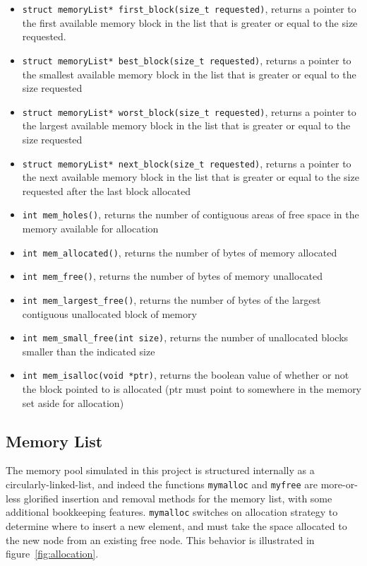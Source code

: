 \documentclass[paper=a4, fontsize=11pt]{scrartcl}
\begin{document}
\begin{itemize}
  \item \texttt{struct memoryList* first\_block(size\_t requested)}, returns a pointer to the first available memory block in the list that is greater or equal to the size requested.
  \item \texttt{struct memoryList* best\_block(size\_t requested)}, returns a pointer to the smallest available memory block in the list that is greater or equal to the size requested
  \item \texttt{struct memoryList* worst\_block(size\_t requested)}, returns a pointer to the largest available memory block in the list that is greater or equal to the size requested
  \item \texttt{struct memoryList* next\_block(size\_t requested)}, returns a pointer to the next available memory block in the list that is greater or equal to the size requested after the last block allocated
  \item \texttt{int mem\_holes()}, returns the number of contiguous areas of free space in the memory available for allocation
  \item \texttt{int mem\_allocated()}, returns the number of bytes of memory allocated
  \item \texttt{int mem\_free()}, returns the number of bytes of memory unallocated
  \item \texttt{int mem\_largest\_free()}, returns the number of bytes of the largest contiguous unallocated block of memory
  \item \texttt{int mem\_small\_free(int size)}, returns the number of unallocated blocks smaller than the indicated size
  \item \texttt{int mem\_isalloc(void *ptr)}, returns the boolean value of whether or not the block pointed to is allocated (ptr must point to somewhere in the memory set aside for allocation)
    
\end{itemize}

\subsection*{Memory List}
The memory pool simulated in this project is structured internally as a circularly-linked-list, and indeed the functions \texttt{mymalloc} and \texttt{myfree} are more-or-less glorified insertion and removal methods for the memory list, with some additional bookkeeping features. \texttt{mymalloc} switches on allocation strategy to determine where to insert a new element, and must take the space allocated to the new node from an existing free node. This behavior is illustrated in figure~\ref{fig:allocation}.
\end{document}
